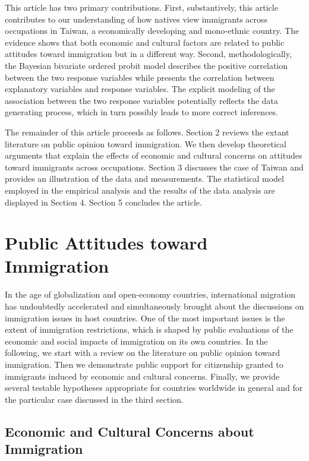 \documentclass[12pt]{article}
\begin{document}
This article has two primary contributions. First, substantively, this article contributes to our understanding of how natives view immigrants across occupations in Taiwan, a economically developing and mono-ethnic country. The evidence shows that both economic and cultural factors are related to public attitudes toward immigration but in a different way. Second, methodologically, the Bayesian bivariate ordered probit model describes the positive correlation between the two response variables while presents the correlation between explanatory variables and response variables. The explicit modeling of the association between the two response variables potentially reflects the data generating process, which in turn possibly leads to more correct inferences.


The remainder of this article proceeds as follows. Section 2 reviews the extant literature on public opinion toward immigration. We then develop theoretical arguments that explain the effects of economic and cultural concerns on attitudes toward immigrants across occupations. Section 3 discusses the case of Taiwan and provides an illustration of the data and measurements. The statistical model employed in the empirical analysis and the results of the data analysis are displayed in Section 4. Section 5 concludes the article.



\section{Public Attitudes toward Immigration}


In the age of globalization and open-economy countries, international migration has undoubtedly accelerated and simultaneously brought about the discussions on immigration issues in host countries. One of the most important issues is the extent of immigration restrictions, which is shaped by public evaluations of the economic and social impacts of immigration on its own countries. In the following, we start with a review on the literature on public opinion toward immigration. Then we demonstrate public support for citizenship granted to immigrants induced by economic and cultural concerns. Finally, we provide several testable hypotheses appropriate for countries worldwide in general and for the particular case discussed in the third section.



\subsection{Economic and Cultural Concerns about Immigration}
\end{document}

